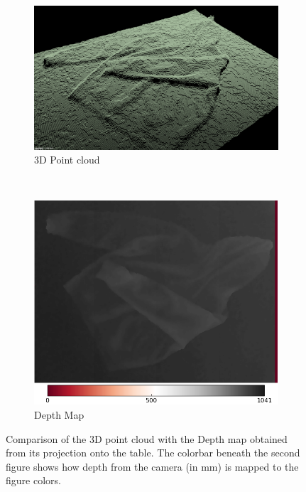 \begin{figure}[htbp]
	\centering
    \begin{subfigure}[l]{0.49\textwidth}
	    \centering
    	\includegraphics[width=\textwidth]
    	{figures/point-cloud-01.png}
    	\caption{3D Point cloud}
	\end{subfigure}
	~
    \begin{subfigure}[r]{0.49\textwidth}
	    \centering
    	\includegraphics[width=\textwidth]
    	{figures/point-cloud-projection-2.png}
    	\caption{Depth Map}
	\end{subfigure}
    \caption[Comparison of the 3D point cloud with the Depth map obtained from its projection onto the table.]
    {Comparison of the 3D point cloud with the Depth map obtained from its projection onto the table. The colorbar beneath the second figure shows how depth from the camera (in mm) is mapped to the figure colors.}
    \label{fig:point_cloud_and_depth_image}
\end{figure}

